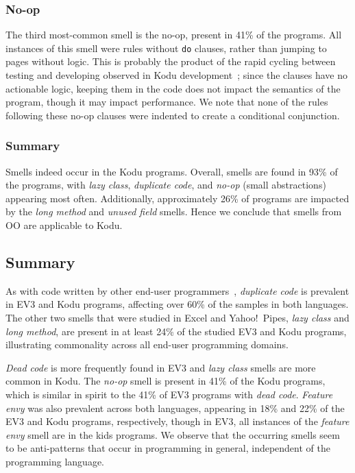 \documentclass[conference]{IEEEtran}
\begin{document}
\subsubsection{No-op}
The third most-common smell is the no-op, present in 41\% of the programs. All instances of this smell were rules without {\tt do} clauses, rather than jumping to pages without logic.  This is probably the product of the rapid cycling between testing and developing observed in Kodu development~\cite{Stolee:2011:ECS:1953163.1953197}; since the clauses have no actionable logic, keeping them in the code does not impact the semantics of the program, though it may impact performance. We note that none of the rules following these no-op clauses were indented to create a conditional conjunction. 


\subsubsection{Summary}
Smells indeed occur in the Kodu programs. Overall, smells are found in 93\% of the programs, with \emph{lazy class}, \emph{duplicate code},  and \emph{no-op} (small abstractions) appearing most often. Additionally, approximately 26\% of programs are impacted by the \emph{long method} and \emph{unused field} smells. Hence we conclude that smells from OO are applicable to Kodu. 

\subsection{Summary}


As with code written by other end-user programmers~\cite{StoleeTSE2013}, \emph{duplicate code} is prevalent in EV3 and Kodu programs, affecting over 60\% of the samples in both languages. The other two smells that were studied in Excel and Yahoo!\ Pipes, \emph{lazy class} and \emph{long method}, are present in at least 24\% of the studied EV3 and Kodu programs, illustrating commonality across all end-user programming domains. 

\emph{Dead code} is more frequently found in EV3 and \emph{lazy class} smells are more common in Kodu. The \emph{no-op} smell is present in 41\% of the Kodu programs, which is similar in spirit to the 41\% of EV3 programs with \emph{dead code}. \emph{Feature envy} was also prevalent across both languages, appearing in 18\% and 22\% of the EV3 and Kodu programs, respectively, though in EV3, all instances of the \emph{feature envy} smell are in the kids programs. 
We observe that the occurring smells seem to be anti-patterns that occur in programming in general, independent of the programming language. 
\end{document}
